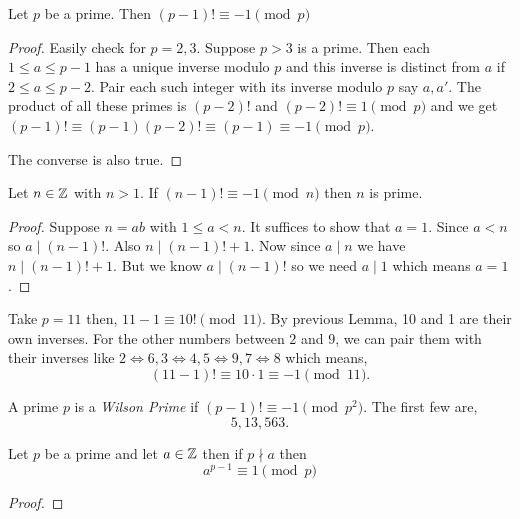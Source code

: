 \begin{theorem}
	Let \( p \) be a prime. Then \( (p - 1)! \equiv -1 \pmod p \)
\end{theorem}
\begin{proof}
	Easily check for \( p = 2, 3 \). Suppose \( p > 3 \) is a prime. Then each \( 1 \le a \le p - 1\) has a unique inverse modulo \( p \) and this inverse is distinct from \( a \) if \( 2 \le a \le p - 2 \). Pair each such integer with its inverse   modulo \( p \) say \( a, a' \). The product of all these primes is \( (p - 2)! \) and \( (p - 2)! \equiv 1 \pmod p \) and we get \( (p -1)! \equiv (p-1)(p - 2)! \equiv (p -1) \equiv -1 \pmod p \).

	\vspace{1em}

	The converse is also true. 
\end{proof}
\begin{prop}
	Let \( n \in \mathbb{Z} \) with \( n > 1 \). If \( (n - 1)! \equiv -1 \pmod n \) then \( n  \) is prime.
\end{prop}
\begin{proof}
	Suppose \( n = ab \) with \( 1 \le a < n \). It suffices to show that \( a = 1 \). Since \( a < n \) so \( a \mid (n - 1)! \). Also \( n \mid (n - 1)! + 1  \). Now since \( a \mid n \) we have \( n \mid (n - 1)! + 1 \). But we know \( a \mid (n - 1)! \) so we need \( a \mid 1 \) which means \( a = 1 \).
\end{proof}
\begin{eg}
	Take \( p = 11 \) then, \( 11 - 1 \equiv 10! \pmod {11} \). By previous Lemma, 10 and 1 are their own inverses. For the other numbers between \( 2\) and \( 9 \), we can pair them with their inverses like \( 2\iff 6, 3 \iff 4, 5 \iff 9, 7 \iff 8 \) which means, \[
		(11 - 1)! \equiv 10 \cdot 1 \equiv -1 \pmod {11}
	.\] 
\end{eg}


\begin{definition}
	A prime \( p \) is a \emph{Wilson Prime} if \( (p - 1)! \equiv -1 \pmod {p^2}\). The first few are, \[
		5, 13, 563
	.\] 
\end{definition}

\begin{theorem}
	Let \( p \) be a prime and let \( a \in \mathbb{Z} \) then if \( p \nmid a \) then \[ a^{p - 1} \equiv 1 \pmod p \]
\end{theorem}
\begin{proof}
	
\end{proof}
